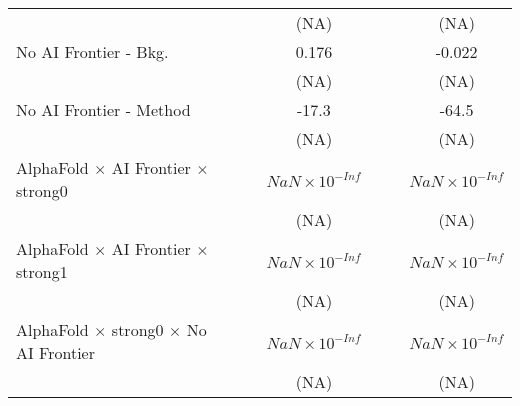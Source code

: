 \begin{tabular}{lcccccc}
                                                                              &                        &                        & (NA)                   &                        &        & (NA)\\   
   No AI Frontier - Bkg.                                                      &                        &                        & 0.176                  &                        &        & -0.022\\   
                                                                              &                        &                        & (NA)                   &                        &        & (NA)\\   
   No AI Frontier - Method                                                    &                        &                        & -17.3                  &                        &        & -64.5\\   
                                                                              &                        &                        & (NA)                   &                        &        & (NA)\\   
   AlphaFold $\times$ AI Frontier $\times$ strong0                            &                        &                        & $NaN\times 10^{-Inf}$  &                        &        & $NaN\times 10^{-Inf}$\\    
                                                                              &                        &                        & (NA)                   &                        &        & (NA)\\   
   AlphaFold $\times$ AI Frontier $\times$ strong1                            &                        &                        & $NaN\times 10^{-Inf}$  &                        &        & $NaN\times 10^{-Inf}$\\    
                                                                              &                        &                        & (NA)                   &                        &        & (NA)\\   
   AlphaFold $\times$ strong0 $\times$ No AI Frontier                         &                        &                        & $NaN\times 10^{-Inf}$  &                        &        & $NaN\times 10^{-Inf}$\\    
                                                                              &                        &                        & (NA)                   &                        &        & (NA)\\   

\end{tabular}
